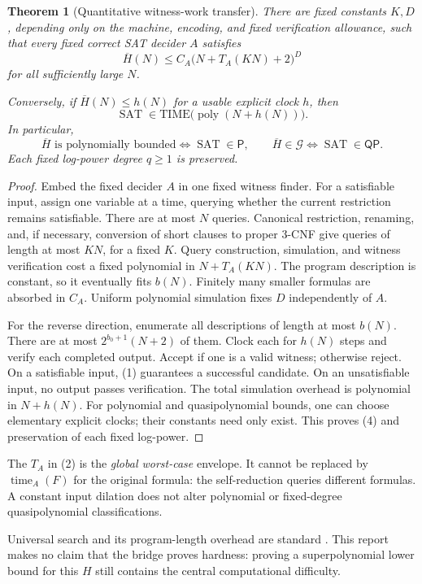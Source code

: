 \documentclass[11pt]{article}
\newtheorem{theorem}{Theorem}
\newcommand{\SAT}{\operatorname{SAT}}
\newcommand{\poly}{\operatorname{poly}}
\newcommand{\QP}{\mathsf{QP}}
\newcommand{\Pclass}{\mathsf P}
\newcommand{\Hbar}{\overline H}
\begin{document}
\begin{theorem}[Quantitative witness-work transfer]
There are fixed constants $K,D$, depending only on the machine,
encoding, and fixed verification allowance, such that every fixed correct SAT decider $A$ satisfies
\[
 \Hbar(N)\le C_A\bigl(N+T_A(KN)+2\bigr)^D
 \tag{2}
\]
for all sufficiently large $N$.

Conversely, if $\Hbar(N)\le h(N)$ for a usable explicit clock $h$, then
\[
 \SAT\in\mathrm{TIME}\bigl(\poly(N+h(N))\bigr).
 \tag{3}
\]
In particular,
\[
 \Hbar\text{ is polynomially bounded}\iff\SAT\in\Pclass,
 \qquad
 \Hbar\in\mathcal G\iff\SAT\in\QP.
 \tag{4}
\]
Each fixed log-power degree $q\ge1$ is preserved.
\end{theorem}

\begin{proof}
Embed the fixed decider $A$ in one fixed witness finder. For a satisfiable
input, assign one variable at a time, querying whether the current
restriction remains satisfiable. There are at most $N$ queries. Canonical
restriction, renaming, and, if necessary, conversion of short clauses to
proper 3-CNF give queries of length at most $KN$, for a fixed $K$.
Query construction, simulation, and witness verification cost a fixed
polynomial in $N+T_A(KN)$. The program description is constant, so it
eventually fits $b(N)$. Finitely many smaller formulas are absorbed in
$C_A$. Uniform polynomial simulation fixes $D$ independently of $A$.

For the reverse direction, enumerate all descriptions of length at most
$b(N)$. There are at most $2^{b_0+1}(N+2)$ of them. Clock each for $h(N)$
steps and verify each completed output. Accept if one is a valid witness;
otherwise reject. On a satisfiable input, (1) guarantees a successful
candidate. On an unsatisfiable input, no output passes verification.
The total simulation overhead is polynomial in $N+h(N)$.
For polynomial and quasipolynomial bounds, one can choose elementary
explicit clocks; their constants need only exist. This proves (4) and
preservation of each fixed log-power.
\end{proof}

The $T_A$ in (2) is the \emph{global worst-case} envelope. It cannot be
replaced by $\operatorname{time}_A(F)$ for the original formula: the
self-reduction queries different formulas. A constant input dilation
does not alter polynomial or fixed-degree quasipolynomial classifications.

Universal search and its program-length overhead are standard
\cite{trevisan2010}. This report makes no claim that the bridge proves
hardness: proving a superpolynomial lower bound for this $H$ still contains
the central computational difficulty.
\end{document}
